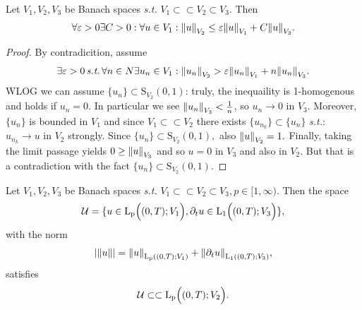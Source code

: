 \documentclass{article}
\begin{document}
\begin{lemma}[Ehrling]
	Let $V_1, V_2, V_3$ be Banach spaces \textit{s.t.} $V_1 \subset \subset V_2 \subset V_3.$ Then
	\[
		\forall \varepsilon >0 \exists C>0: \forall u \in V_1: \norm{u}_{V_2} \leq \varepsilon \norm{u}_{V_1}+C \norm{u}_{V_3}.
	\]
\end{lemma}

\begin{proof}
	By contradicition, assume
	\[
		\exists \varepsilon >0 \, \text{\textit{s.t.}} \, \forall n \in N \exists u_n \in V_1: \norm{u_n}_{V_2} > \varepsilon \norm{u_n}_{V_1}+n \norm{u_n}_{V_3}.
	\]
	WLOG we can assume $\{u_n\} \subset \text{S}_{V_2}(0,1)$: truly, the inequaility is 1-homogenous and holds if $u_n = 0.$ In particular we see $\norm{u_n}_{V_3} < \frac{1}{n}$, so $u_n \to 0$ in $V_3.$ Moreover, $\{u_n\}$ is bounded in $V_1$ and since $V_1 \subset \subset V_2$ there exists $\{u_{n_k}\} \subset \{u_n\}$ \textit{s.t.}: $u_{n_k} \to u$ in $V_2$ strongly. Since $\{u_n\} \subset \text{S}_{V_2}(0,1),$ also $\norm{u}_{V_2} = 1.$ Finally, taking the limit passage yields $0 \geq \norm{u}_{V_3}$ and so $u = 0$ in $V_3$ and also in $V_2$. But that is a contradiction with the fact $\{u_n\} \subset \text{S}_{V_2}(0,1).$
\end{proof}
\begin{theorem}
	Let $V_1, V_2, V_3$ be Banach spaces \textit{s.t.} $V_1 \subset \subset V_2 \subset V_3, p \in [1, \infty).$ Then the space
	\[
		\mathcal{U} = \{u\in \text{L}_{\text{p}}\!\,\Bigl( (0,T);V_1 \Bigr),  \partial_t u \in \text{L}_{\text{1}}\!\,\Bigl( (0,T);V_3 \Bigr)\},
	\]
	with the norm
	\[
		|\norm{u}| = \norm{u}_{\text{L}_{\text{p}}\!\,\left( (0,T);V_1 \right)}+ \norm{\partial_t u}_{\text{L}_{\text{1}}\!\,\left( (0,T);V_3 \right)},
	\]
	satisfies
	\[
		\mathcal{U} \subset \subset \text{L}_{\text{p}}\!\,\Bigl( (0,T);V_2 \Bigr).
	\]
\end{theorem}
\end{document}
